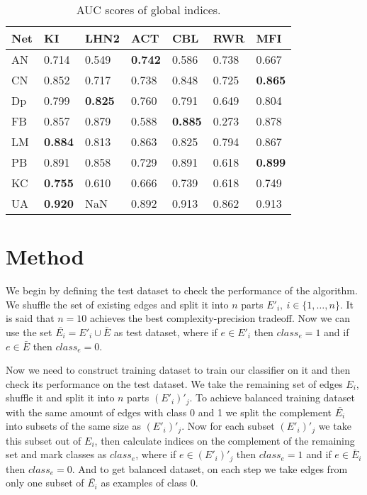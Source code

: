 \documentclass{llncs}
\begin{document}
\begin{table}
\begin{center}
\caption{AUC scores of global indices.}
\begin{tabular}{| l | l | l | l | l | l | l |}
\hline
Net & KI & LHN2 & ACT & CBL & RWR & MFI \\ \hline
AN & 0.714 & 0.549 & \textbf{0.742} & 0.586 & 0.738 & 0.667 \\ \hline
CN & 0.852 & 0.717 & 0.738 & 0.848 & 0.725 & \textbf{0.865} \\ \hline
Dp & 0.799 & \textbf{0.825} & 0.760 & 0.791 & 0.649 & 0.804 \\ \hline
FB & 0.857 & 0.879 & 0.588 & \textbf{0.885} & 0.273 & 0.878 \\ \hline
LM & \textbf{0.884} & 0.813 & 0.863 & 0.825 & 0.794 & 0.867 \\ \hline
PB & 0.891 & 0.858 & 0.729 & 0.891 & 0.618 & \textbf{0.899} \\ \hline
KC & \textbf{0.755} & 0.610 & 0.666 & 0.739 & 0.618 & 0.749 \\ \hline
UA & \textbf{0.920} & NaN & 0.892 & 0.913 & 0.862 & 0.913 \\ 
\hline
\end{tabular}
\end{center}
\end{table}
%
\section{Method}
%
We begin by defining the test dataset to check the performance of the algorithm. We shuffle the set of existing edges and split it into $n$ parts $E'_i, \ i \in \{1, \ldots, n\}$. It is said that $n = 10$ achieves the best complexity-precision tradeoff. Now we can use the set $\bar{E_i} = E'_i \cup \bar{E}$ as test dataset, where if $e \in E'_i$ then $class_e = 1$ and if $e \in \bar{E}$ then $class_e = 0$.

Now we need to construct training dataset to train our classifier on it and then check its performance on the test dataset. We take the remaining set of edges $E_i$, shuffle it and split it into $n$ parts $(E'_i)'_j$. To achieve balanced training dataset with the same amount of edges with class 0 and 1 we split the complement $\bar{E_i}$ into subsets of the same size as $(E'_i)'_j$. Now for each subset $(E'_i)'_j$ we take this subset out of $E_i$, then calculate indices on the complement of the remaining set and mark classes as $class_e$, where if $e \in (E'_i)'_j$ then $class_e = 1$ and if $e \in \bar{E}_i$ then $class_e = 0$. And to get balanced dataset, on each step we take edges from only one subset of $\bar{E_i}$ as examples of class 0.
\end{document}
